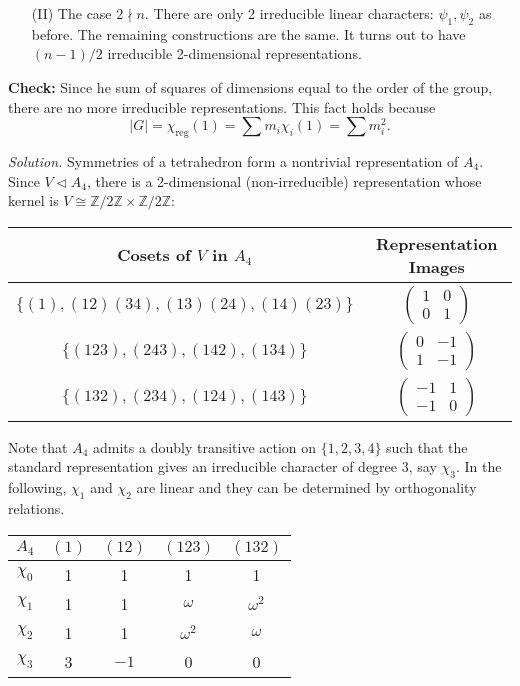 \documentclass{mathproblems}
\newcommand\Z{\mathbb{Z}}
\begin{document}
\begin{questions}
\begin{itemize}
\item[(II)] The case $2\nmid n$. There are only 2 irreducible linear characters: $\psi_1,\psi_2$ as before. The remaining constructions are the same. It turns out to have $(n-1)/2$ irreducible 2-dimensional representations.
\end{itemize}
\textbf{Check:} Since he sum of squares of dimensions equal to the order of the
group, there are no more irreducible representations. This fact holds because
$$
|G|=\chi_{\operatorname{reg}}(1)=\sum m_i \chi_i(1)=\sum m_i^2.
$$


\textit{Solution.} Symmetries of a tetrahedron form a nontrivial representation of $A_4$. Since $V\triangleleft A_4$, there is a 2-dimensional (non-irreducible) representation whose kernel is $V\cong \Z/2\Z\times \Z/2\Z$:
\begin{center}
\begin{tabular}{c|c}
Cosets of $V$ in $A_4$ & Representation Images \\
\hline
$\{(1),(12)(34),(13)(24),(14)(23)\}$ & $\begin{pmatrix}
1 & 0 \\
0 & 1\end{pmatrix}$ \\
$\{(123),(243),(142),(134)\}$ & $\begin{pmatrix}0 & -1 \\
1 & -1\end{pmatrix}$ \\
$\{(132),(234),(124),(143)\}$ & $\begin{pmatrix}-1 & 1 \\
-1 & 0\end{pmatrix}$
\end{tabular}
\end{center}

Note that $A_4$ admits a doubly transitive action on $\{1,2,3,4\}$ such that the standard representation gives an irreducible character of degree 3, say $\chi_3$. In the following, $\chi_1$ and $\chi_2$ are linear and they can be determined by orthogonality relations.
\begin{center}
\begin{tabular}{c|cccc}
$A_4$ & $(1)$ & $(12)$ & $(123)$ & $(132)$\\
\hline
$\chi_0$ & 1 & 1 & 1 & 1\\
$\chi_1$ & 1 & 1 & $\omega$ & $\omega^2$\\
$\chi_2$ & 1 & 1 & $\omega^2$ & $\omega$\\
$\chi_3$ & 3 & $-1$ & 0 & 0\\
\end{tabular}
\end{center}



\end{questions}
\end{document}

